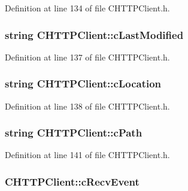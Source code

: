 \-Definition at line 134 of file \-C\-H\-T\-T\-P\-Client.\-h.

\hypertarget{class_c_h_t_t_p_client_a9913b3d73cb9a8172a8ca5e13d39088f}{
\subsubsection[{c\-Last\-Modified}]{\setlength{\rightskip}{0pt plus 5cm}string {\bf \-C\-H\-T\-T\-P\-Client\-::c\-Last\-Modified}}}\label{class_c_h_t_t_p_client_a9913b3d73cb9a8172a8ca5e13d39088f}


\-Definition at line 137 of file \-C\-H\-T\-T\-P\-Client.\-h.

\hypertarget{class_c_h_t_t_p_client_a2d2289bf6605dbe853143fb523f81058}{
\subsubsection[{c\-Location}]{\setlength{\rightskip}{0pt plus 5cm}string {\bf \-C\-H\-T\-T\-P\-Client\-::c\-Location}}}\label{class_c_h_t_t_p_client_a2d2289bf6605dbe853143fb523f81058}


\-Definition at line 138 of file \-C\-H\-T\-T\-P\-Client.\-h.

\hypertarget{class_c_h_t_t_p_client_a7f2cc6944a2535539772f62b51f0c568}{
\subsubsection[{c\-Path}]{\setlength{\rightskip}{0pt plus 5cm}string {\bf \-C\-H\-T\-T\-P\-Client\-::c\-Path}}}\label{class_c_h_t_t_p_client_a7f2cc6944a2535539772f62b51f0c568}


\-Definition at line 141 of file \-C\-H\-T\-T\-P\-Client.\-h.

\hypertarget{class_c_h_t_t_p_client_a1ac75d26c210602da43085a9ba1de5bb}{
\subsubsection[{c\-Recv\-Event}]{ {\bf \-C\-H\-T\-T\-P\-Client\-::c\-Recv\-Event}}}\label{class_c_h_t_t_p_client_a1ac75d26c210602da43085a9ba1de5bb}


